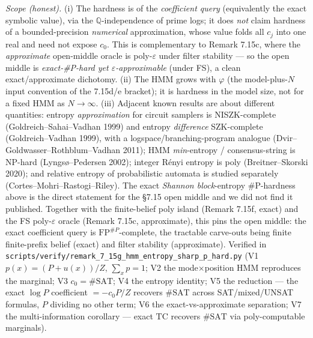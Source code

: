 \documentclass[
]{article}
\begin{document}
\emph{Scope (honest).} (i) The hardness is of the \emph{coefficient query} (equivalently the
exact symbolic value), via the $\mathbb Q$-independence of prime logs; it does \emph{not} claim
hardness of a bounded-precision \emph{numerical} approximation, whose value folds all $c_j$ into
one real and need not expose $c_0$. This is complementary to Remark 7.15c, where the
\emph{approximate} open-middle oracle is poly-$\varepsilon$ under filter stability --- so the
open middle is \emph{exact-\#P-hard yet $\varepsilon$-approximable} (under FS), a clean
exact/approximate dichotomy. (ii) The HMM grows with $\varphi$ (the model-plus-$N$ input
convention of the 7.15d/e bracket); it is hardness in the model size, not for a fixed HMM as
$N\to\infty$. (iii) Adjacent known results are about different quantities: entropy
\emph{approximation} for circuit samplers is NISZK-complete (Goldreich--Sahai--Vadhan 1999) and
entropy \emph{difference} SZK-complete (Goldreich--Vadhan 1999), with a logspace/branching-program
analogue (Dvir--Goldwasser--Rothblum--Vadhan 2011); HMM \emph{min}-entropy / consensus-string is
NP-hard (Lyngs\o--Pedersen 2002); integer R\'enyi entropy is poly (Breitner--Skorski 2020); and
relative entropy of probabilistic automata is studied separately (Cortes--Mohri--Rastogi--Riley).
The exact \emph{Shannon block}-entropy \#P-hardness above is the direct statement for the §7.15
open middle and we did not find it published. Together with the finite-belief poly island
(Remark 7.15f, exact) and the FS poly-$\varepsilon$ oracle (Remark 7.15c, approximate), this pins
the open middle: the exact coefficient query is $\mathrm{FP}^{\#P}$-complete, the tractable
carve-outs being finite finite-prefix belief (exact) and filter stability (approximate).
Verified in \texttt{scripts/verify/remark\_7\_15g\_hmm\_entropy\_sharp\_p\_hard.py} (V1
$p(x)=(P{+}u(x))/Z$, $\sum_x p=1$; V2 the mode$\times$position HMM reproduces the marginal; V3
$c_0=\#\mathrm{SAT}$; V4 the entropy identity; V5 the reduction --- the exact $\log P$ coefficient
$=-c_0P/Z$ recovers $\#\mathrm{SAT}$ across SAT/mixed/UNSAT formulas, $P$ dividing no other term;
V6 the exact-vs-approximate separation; V7 the multi-information corollary --- exact $\mathrm{TC}$
recovers $\#\mathrm{SAT}$ via poly-computable marginals).
\end{document}
